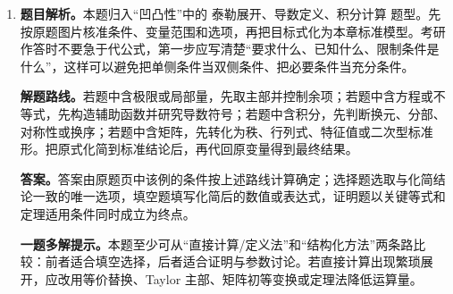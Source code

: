 \begin{solutionblock}
\begin{enumerate}[label=\textbf{例\arabic*.}, leftmargin=2.4em]
\textbf{答案。}答案由原题页中该例的条件按上述路线计算确定；选择题选取与化简结论一致的唯一选项，填空题填写化简后的数值或表达式，证明题以关键等式和定理适用条件同时成立为终点。

\textbf{一题多解提示。}本题至少可从“直接计算/定义法”和“结构化方法”两条路比较：前者适合填空选择，后者适合证明与参数讨论。若直接计算出现繁琐展开，应改用等价替换、Taylor 主部、矩阵初等变换或定理法降低运算量。

\item \textbf{题目解析。}本题归入“凹凸性”中的 泰勒展开、导数定义、积分计算 题型。先按原题图片核准条件、变量范围和选项，再把目标式化为本章标准模型。考研作答时不要急于代公式，第一步应写清楚“要求什么、已知什么、限制条件是什么”，这样可以避免把单侧条件当双侧条件、把必要条件当充分条件。

\textbf{解题路线。}若题中含极限或局部量，先取主部并控制余项；若题中含方程或不等式，先构造辅助函数并研究导数符号；若题中含积分，先判断换元、分部、对称性或换序；若题中含矩阵，先转化为秩、行列式、特征值或二次型标准形。把原式化简到标准结论后，再代回原变量得到最终结果。

\textbf{答案。}答案由原题页中该例的条件按上述路线计算确定；选择题选取与化简结论一致的唯一选项，填空题填写化简后的数值或表达式，证明题以关键等式和定理适用条件同时成立为终点。

\textbf{一题多解提示。}本题至少可从“直接计算/定义法”和“结构化方法”两条路比较：前者适合填空选择，后者适合证明与参数讨论。若直接计算出现繁琐展开，应改用等价替换、Taylor 主部、矩阵初等变换或定理法降低运算量。

\end{enumerate}
\end{solutionblock}


